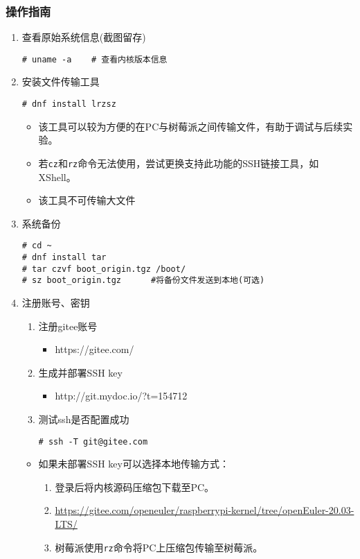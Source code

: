 \documentclass{article}
\begin{document}
\subsubsection{操作指南}
\begin{enumerate}
	\item 查看原始系统信息(截图留存)
	      \begin{lstlisting}
# uname -a    # 查看内核版本信息
\end{lstlisting}
	\item 安装文件传输工具
	      \begin{lstlisting}
# dnf install lrzsz
\end{lstlisting}
	      \begin{itemize}
		      \item 该工具可以较为方便的在PC与树莓派之间传输文件，有助于调试与后续实验。
		      \item 若\verb|cz|和\verb|rz|命令无法使用，尝试更换支持此功能的SSH链接工具，如XShell。
		      \item 该工具不可传输大文件
	      \end{itemize}

	\item 系统备份
	      \begin{lstlisting}
# cd ~
# dnf install tar
# tar czvf boot_origin.tgz /boot/
# sz boot_origin.tgz      #将备份文件发送到本地(可选)
    \end{lstlisting}

	\item 注册账号、密钥
	      \begin{enumerate}
		      \item 注册gitee账号
		            \begin{itemize}
			            \item https://gitee.com/
		            \end{itemize}
		      \item 生成并部署SSH key
		            \begin{itemize}
			            \item http://git.mydoc.io/?t=154712
		            \end{itemize}
		      \item 测试ssh是否配置成功
		            \begin{lstlisting}
# ssh -T git@gitee.com
\end{lstlisting}
	      \end{enumerate}
	      \begin{itemize}
		      \item 如果未部署SSH key可以选择本地传输方式：
		            \begin{enumerate}
			            \item 登录后将内核源码压缩包下载至PC。
			            \item \url{https://gitee.com/openeuler/raspberrypi-kernel/tree/openEuler-20.03-LTS/}
			            \item 树莓派使用\verb|rz|命令将PC上压缩包传输至树莓派。
		            \end{enumerate}
	      \end{itemize}


\end{enumerate}
\end{document}
